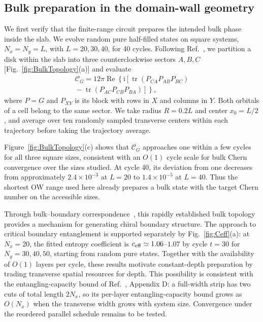 \documentclass[aps,prb,10pt,twocolumn,superscriptaddress,longbibliography,floatfix]{revtex4-2}
\newcommand{\ii}{\mathrm{i}}
\newcommand{\mc}[1]{\mathcal{#1}}
\newcommand{\claudeadd}[1]{{\color{orange}#1}}
\begin{document}
{\color{blue}
\subsection{Bulk preparation in the domain-wall geometry}
\label{sec:BulkTopology}

We first verify that the finite-range circuit prepares the intended bulk phase inside the slab. We evolve random pure half-filled states on square systems, $N_x=N_y=L$, with $L=20,30,40$, for 40 cycles. Following Ref.~\cite{Kitaev2006}, we partition a disk within the slab into three counterclockwise sectors $A,B,C$ [Fig.~\ref{fig:BulkTopology}(a)] and evaluate
\begin{align}
    \mc C_G=12\pi\operatorname{Re}\!\left\{\ii\left[\operatorname{tr}(P_{CA}P_{AB}P_{BC})\right.\right.\nonumber\\
    \left.\left.{}-\operatorname{tr}(P_{AC}P_{CB}P_{BA})\right]\right\},
    \label{eq:KitaevChern}
\end{align}
where \claudeadd{$P=G$} and $P_{XY}$ is its block with rows in $X$ and columns in $Y$. Both orbitals of a cell belong to the same sector. We take radius $R=0.2L$ and center $x_0=L/2$, and average over ten randomly sampled transverse centers within each trajectory before taking the trajectory average.

Figure~\ref{fig:BulkTopology}(c) shows that $\overline{\mc C_G}$ approaches one within a few cycles for all three square sizes, consistent with an $O(1)$ cycle scale for bulk Chern convergence over the sizes studied. At cycle 40, its deviation from one decreases from approximately $2.4\times10^{-3}$ at $L=20$ to $1.4\times10^{-5}$ at $L=40$. Thus the shortest OW range used here already prepares a bulk state with the target Chern number on the accessible sizes.

Through bulk--boundary correspondence~\cite{Hatsugai1993}, this rapidly established bulk topology provides a mechanism for generating chiral boundary structure. The approach to critical boundary entanglement is supported separately by Fig.~\ref{fig:Ceff}(a): at $N_x=20$, the fitted entropy coefficient is $c_{\rm eff}\simeq1.06$--$1.07$ by cycle $t=30$ for $N_y=30,40,50$, starting from random pure states. Together with the availability of $O(1)$ layers per cycle, these results motivate constant-depth preparation by trading transverse spatial resources for depth. This possibility is consistent with the entangling-capacity bound of Ref.~\cite{LuLessaKimHsieh2022}, Appendix D: a full-width strip has two cuts of total length $2N_x$, so its per-layer entangling-capacity bound grows as $O(N_x)$ when the transverse width grows with system size. Convergence under the reordered parallel schedule remains to be tested.

}
\end{document}
